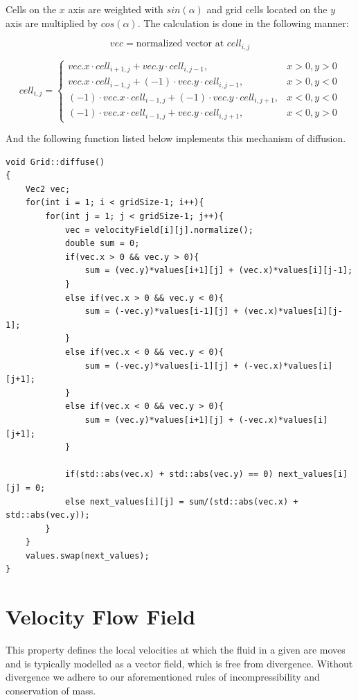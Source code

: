 \documentclass[12pt, titlepage]{article}
\begin{document}
\bigskip

Cells on the $x$ axis are weighted with $sin(\alpha)$ and grid cells located on the $y$ axis are multiplied by $cos(\alpha)$. The calculation is done in the following manner:

\[
	vec = \text{normalized vector at }cell_{i, j}
\]

\[
	cell_{i, j} = \begin{cases}
	vec.x \cdot cell_{i+1, j} + vec.y \cdot cell_{i, j-1}, & x > 0, y > 0 \\
	vec.x \cdot cell_{i-1, j} + (-1)\cdot vec.y \cdot cell_{i, j-1}, & x > 0, y < 0 \\
	(-1) \cdot vec.x \cdot cell_{i-1, j} + (-1) \cdot vec.y \cdot cell_{i, j+1}, & x < 0, y < 0 \\
	(-1) \cdot vec.x \cdot cell_{i-1, j} + vec.y \cdot cell_{i, j+1}, & x < 0, y > 0
	\end{cases}
\]

And the following function listed below implements this mechanism of diffusion.

\pagebreak

\begin{lstlisting}
void Grid::diffuse()
{
    Vec2 vec;
    for(int i = 1; i < gridSize-1; i++){
        for(int j = 1; j < gridSize-1; j++){
            vec = velocityField[i][j].normalize();
            double sum = 0;
            if(vec.x > 0 && vec.y > 0){
                sum = (vec.y)*values[i+1][j] + (vec.x)*values[i][j-1];
            }
            else if(vec.x > 0 && vec.y < 0){
                sum = (-vec.y)*values[i-1][j] + (vec.x)*values[i][j-1];
            }
            else if(vec.x < 0 && vec.y < 0){
                sum = (-vec.y)*values[i-1][j] + (-vec.x)*values[i][j+1];
            }
            else if(vec.x < 0 && vec.y > 0){
                sum = (vec.y)*values[i+1][j] + (-vec.x)*values[i][j+1];
            }

            if(std::abs(vec.x) + std::abs(vec.y) == 0) next_values[i][j] = 0;
            else next_values[i][j] = sum/(std::abs(vec.x) + std::abs(vec.y));
        }
    }
    values.swap(next_values);
}
\end{lstlisting}

\section{Velocity Flow Field}

This property defines the local velocities at which the fluid in a given are moves and is typically modelled as a vector field, which is free from divergence. Without divergence we adhere to our aforementioned rules of incompressibility and conservation of mass.
\end{document}
